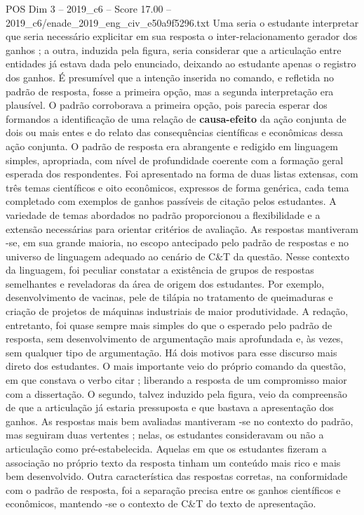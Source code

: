 \begin{textsample}{POS Dim 3 – 2019\_c6 – Score 17.00 – 2019\_c6/enade\_2019\_eng\_civ\_e50a9f5296.txt}
Uma seria o estudante interpretar que seria necessário explicitar em sua resposta o inter-relacionamento gerador dos ganhos ; a outra, induzida pela figura, seria considerar que a articulação entre entidades já estava dada pelo enunciado, deixando ao estudante apenas o registro dos ganhos.
É presumível que a intenção inserida no comando, e refletida no padrão de resposta, fosse a primeira opção, mas a segunda interpretação era plausível.
O padrão corroborava a primeira opção, pois parecia esperar dos formandos a identificação de uma relação de \textbf{causa-efeito} da ação conjunta de dois ou mais entes e do relato das consequências científicas e econômicas dessa ação conjunta.
O padrão de resposta era abrangente e redigido em linguagem simples, apropriada, com nível de profundidade coerente com a formação geral esperada dos respondentes.
Foi apresentado na forma de duas listas extensas, com três temas científicos e oito econômicos, expressos de forma genérica, cada tema completado com exemplos de ganhos passíveis de citação pelos estudantes.
A variedade de temas abordados no padrão proporcionou a flexibilidade e a extensão necessárias para orientar critérios de avaliação.
As respostas mantiveram -se, em sua grande maioria, no escopo antecipado pelo padrão de respostas e no universo de linguagem adequado ao cenário de C\&T da questão.
Nesse contexto da linguagem, foi peculiar constatar a existência de grupos de respostas semelhantes e reveladoras da área de origem dos estudantes.
Por exemplo, desenvolvimento de vacinas, pele de tilápia no tratamento de queimaduras e criação de projetos de máquinas industriais de maior produtividade.
A redação, entretanto, foi quase sempre mais simples do que o esperado pelo padrão de resposta, sem desenvolvimento de argumentação mais aprofundada e, às vezes, sem qualquer tipo de argumentação.
Há dois motivos para esse discurso mais direto dos estudantes.
O mais importante veio do próprio comando da questão, em que constava o verbo citar ; liberando a resposta de um compromisso maior com a dissertação.
O segundo, talvez induzido pela figura, veio da compreensão de que a articulação já estaria pressuposta e que bastava a apresentação dos ganhos.
As respostas mais bem avaliadas mantiveram -se no contexto do padrão, mas seguiram duas vertentes ; nelas, os estudantes consideravam ou não a articulação como pré-estabelecida.
Aquelas em que os estudantes fizeram a associação no próprio texto da resposta tinham um conteúdo mais rico e mais bem desenvolvido.
Outra característica das respostas corretas, na conformidade com o padrão de resposta, foi a separação precisa entre os ganhos científicos e econômicos, mantendo -se o contexto de C\&T do texto de apresentação.

\end{textsample}
